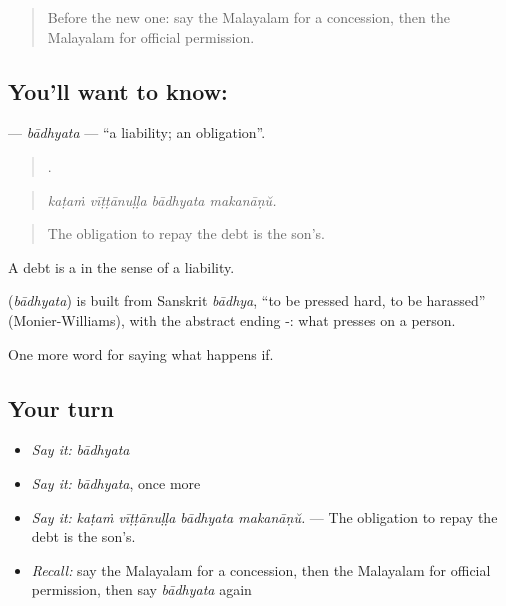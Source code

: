 \label{lesson:ML-C444-badhyata}



\begin{quote}
Before the new one: say the Malayalam for a concession, then the Malayalam for official permission.
\end{quote}

\subsection*{You'll want to know: }
\textbf{} — \emph{bādhyata} — \textquotedblleft{}a liability; an obligation\textquotedblright{}.

\begin{quote}
   .
\end{quote}

\begin{quote}
\emph{kaṭaṁ vīṭṭānuḷḷa bādhyata makanāṇŭ.}
\end{quote}

\begin{quote}
The obligation to repay the debt is the son's.
\end{quote}

A debt is a  in the sense of a liability.

\begin{cousinweb}
\textbf{} (\emph{bādhyata}) is built from Sanskrit \emph{bādhya}, \textquotedblleft{}to be pressed hard, to be harassed\textquotedblright{} (Monier-Williams), with the abstract ending -: what presses on a person.
\end{cousinweb}

\begin{grammarlens}[title={What you've built}]
One more word for saying what happens if.
\end{grammarlens}

\subsection*{Your turn}
\begin{itemize}
\raggedright
  \item \emph{Say it:} \emph{bādhyata}
  \item \emph{Say it:} \emph{bādhyata}, once more
  \item \emph{Say it:} \emph{kaṭaṁ vīṭṭānuḷḷa bādhyata makanāṇŭ.} — The obligation to repay the debt is the son's.
  \item \emph{Recall:} say the Malayalam for a concession, then the Malayalam for official permission, then say \emph{bādhyata} again
\end{itemize}

